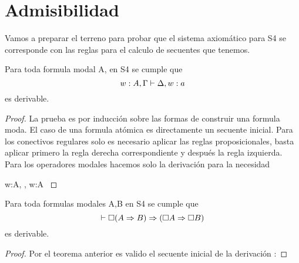 \section{Admisibilidad}

Vamos a preparar el terreno para probar que el sistema axiomático para S4 se corresponde con las reglas para el calculo de secuentes que tenemos.

\begin{teo}
  Para toda formula modal A, en S4 se cumple que  
  \begin{equation*}
    w:A, \Gamma \vdash \Delta,w:a 
  \end{equation*}
  es derivable.
\end{teo}

\begin{proof}
  La prueba es por inducción sobre las formas de construir una formula moda. El caso de una formula atómica es directamente un secuente inicial.
  Para los conectivos regulares solo es necesario aplicar las reglas proposicionales, basta aplicar primero la regla derecha correspondiente y después la regla izquierda.
  Para los operadores modales hacemos solo la derivación para la necesidad


  {
    w:\necesidad A, \Gamma \derives \Delta, w:\necesidad A
  }

\end{proof}


\begin{teo}
  Para toda formulas modales A,B en S4 se cumple que  
  \begin{equation*}
    \vdash \square(A \Rightarrow B) \Rightarrow (\square A \Rightarrow \square B) 
  \end{equation*}
  es derivable.
\end{teo}



\begin{proof}

  Por el teorema anterior es valido el secuente inicial de la derivación :

\end{proof}

